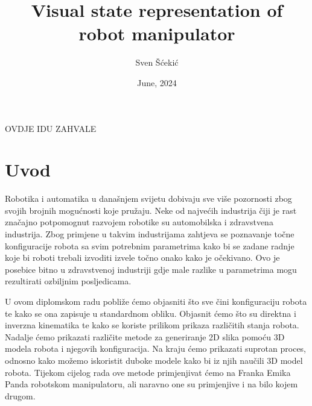 \documentclass[times, utf8, diplomskirad]{fer}
\title{Visual state representation of robot manipulator}
\author{Sven Šćekić}
\date{June, 2024}
\begin{document}
\maketitle






\begin{zahvale}
    OVDJE IDU ZAHVALE
\end{zahvale}


\mainmatter
{}


\tableofcontents

\setcounter{page}{1}
\mainmatter

\chapter{Uvod}
\label{pog:uvod}
\hspace{\parindent}Robotika i automatika u današnjem svijetu dobivaju sve više pozornosti zbog svojih brojnih mogućnosti koje pružaju.
Neke od najvećih industrija čiji je rast značajno potpomognut razvojem robotike su automobilska i zdravstvena industrija.
Zbog primjene u takvim industrijama zahtjeva se poznavanje točne konfiguracije robota sa svim potrebnim parametrima kako
bi se zadane radnje koje bi roboti trebali izvoditi izvele točno onako kako je očekivano.
Ovo je posebice bitno u zdravstvenoj industriji gdje male razlike u parametrima mogu rezultirati ozbiljnim posljedicama.

U ovom diplomskom radu pobliže ćemo objasniti što sve čini konfiguraciju robota te kako se ona zapisuje u standardnom obliku.
Objasnit ćemo što su direktna i inverzna kinematika te kako se koriste prilikom prikaza različitih stanja robota.
Nadalje ćemo prikazati različite metode za generiranje 2D slika pomoću 3D modela robota i njegovih konfiguracija.
Na kraju ćemo prikazati suprotan proces, odnosno kako možemo iskoristit duboke modele kako bi iz njih naučili 3D model robota.
Tijekom cijelog rada ove metode primjenjivat ćemo na Franka Emika Panda robotskom manipulatoru, ali naravno one su primjenjive i na bilo kojem drugom.
\end{document}
